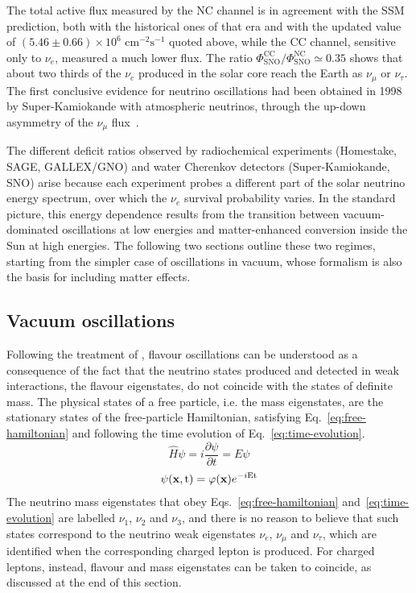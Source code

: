 The total active flux measured by the \ac{NC} channel is in agreement with the \ac{SSM} prediction, both with the historical ones of that era and with the updated value of $(5.46 \pm 0.66) \times 10^{6} \text{ cm}^{-2}\text{s}^{-1}$ quoted above, while the \ac{CC} channel, sensitive only to $\nu_e$, measured a much lower flux. The ratio $\Phi^\text{CC}_\text{SNO}/\Phi^\text{NC}_\text{SNO}  \simeq 0.35$ shows that about two thirds of the $\nu_e$ produced in the solar core reach the Earth as $\nu_\mu$ or $\nu_\tau$. The first conclusive evidence for neutrino oscillations had been obtained in 1998 by Super-Kamiokande with atmospheric neutrinos, through the up-down asymmetry of the $\nu_\mu$ flux~\cite{SuperK1998}.

The different deficit ratios observed by radiochemical experiments (Homestake, SAGE, GALLEX/GNO) and water Cherenkov detectors (Super-Kamiokande, SNO) arise because each experiment probes a different part of the solar neutrino energy spectrum, over which the $\nu_e$ survival probability varies. In the standard picture, this energy dependence results from the transition between vacuum-dominated oscillations at low energies and matter-enhanced conversion inside the Sun at high energies. The following two sections outline these two regimes, starting from the simpler case of oscillations in vacuum, whose formalism is also the basis for including matter effects.



\subsection{Vacuum oscillations}
\label{subsec:VacuumOscillations}

Following the treatment of \cite{Thomson}, flavour oscillations can be understood as a consequence of the fact that the neutrino states produced and detected in weak interactions, the flavour eigenstates, do not coincide with the states of definite mass. The physical states of a free particle, i.e. the mass eigenstates, are the stationary states of the free-particle Hamiltonian, satisfying Eq.~\ref{eq:free-hamiltonian} and following the time evolution of Eq.~\ref{eq:time-evolution}.
\begin{equation}
    \label{eq:free-hamiltonian}
    \hat{H} \psi = i \frac{\partial \psi}{\partial t} = E \psi
\end{equation}
\begin{equation}
    \label{eq:time-evolution}
    \psi(\text{\textbf{x}}, \text{t}) = \varphi (\text{\textbf{x}}) e ^{-i \text{Et}}
\end{equation}
The neutrino mass eigenstates that obey Eqs.~\ref{eq:free-hamiltonian} and~\ref{eq:time-evolution} are labelled $\nu_1$, $\nu_2$ and $\nu_3$, and there is no reason to believe that such states correspond to the neutrino weak eigenstates $\nu_e$, $\nu_\mu$ and $\nu_\tau$, which are identified when the corresponding charged lepton is produced. For charged leptons, instead, flavour and mass eigenstates can be taken to coincide, as discussed at the end of this section.


